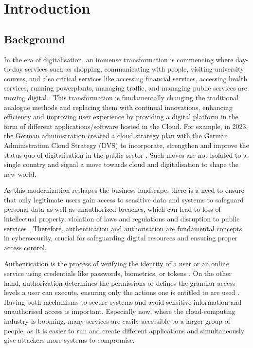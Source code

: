 \chapter{Introduction}
\section{Background}
In the era of digitalisation, an immense transformation is commencing where day-to-day services such as shopping, communicating with people, visiting university courses, and also critical services like accessing financial services, accessing health services, running powerplants, managing traffic, and managing public services are moving digital \citep{intro_cloud_critical_infra}. This transformation is fundamentally changing the traditional analogue methods and replacing them with continual innovations, enhancing efficiency and improving user experience by providing a digital platform in the form of different applications/software hosted in the Cloud. For example, in 2023, the German administration created a cloud strategy plan with the German Administration Cloud Strategy (DVS) to incorporate, strengthen and improve the status quo of digitalisation in the public sector \citep{german_gov_cloud_plan}. Such moves are not isolated to a single country and signal a move towards cloud and digitalisation to shape the new world. \newline

As this modernization reshapes the business landscape, there is a need to ensure that only legitimate users gain access to sensitive data and systems to safeguard personal data as well as unauthorized breaches, which can lead to loss of intellectual property, violation of laws and regulations and disruption to public services \citep{critical_infra_reason}. Therefore, authentication and authorisation are fundamental concepts in cybersecurity, crucial for safeguarding digital resources and ensuring proper access control. \newline

Authentication is the process of verifying the identity of a user or an online service using credentials like passwords, biometrics, or tokens \citep{authetication_intro}. On the other hand, authorization determines the permissions or defines the granular access levels a user can execute, ensuring only the actions one is entitled to are used \citep{Gollmann2021-at}. Having both mechanisms to secure systems and avoid sensitive information and unauthorised access is important. Especially now, where the cloud-computing industry is booming, many services are easily accessible to a larger group of people, as it is easier to run and create different applications and simultaneously give attackers more systems to compromise.\newline

